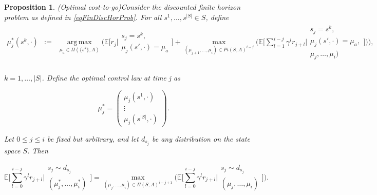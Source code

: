 \documentclass[11pt]{article} %
\newtheorem{prop}{Proposition}
\DeclareMathOperator*{\argmax}{arg\,max}
\begin{document}
\begin{prop}(Optimal cost-to-go)\label{lemBuildingFiniteSolution}
	Consider the discounted finite horizon problem as defined in \ref{eqFinDiscHorProb}. For all $s^1,\dots,s^{|S|} \in S$, define
\begin{equation}
	\begin{array}{clll}
		\mu_j^*(s^k,\cdot)	& := 	& \argmax\limits_{\mu_a \in \Pi(\{s^k\},A)} \Big( \mathbb{E}\Big[r_j \Big| \begin{array}{c}
																							s_j = s^k, \\
																							\mu_j(s',\cdot) = \mu_a
																						\end{array} 
																							\Big] + \max\limits_{(\mu_{j+1},\dots,\mu_i) \in Pi(S,A)^{i-j}}\Big( \mathbb{E} \Big[ \sum\limits_{l=1}^{i-j}\gamma^l r_{j+l} \Big| \begin{array}{c}
															s_j = s^k, \\
															\mu_j(s',\cdot) = \mu_a, \\
															\mu_j,\dots,\mu_i)
														\end{array} \Big] \Big)\Big),\\
	\end{array}
\end{equation}

$k=1,\dots,|S|$. Define the optimal control law at time j as

\begin{equation}
	\mu_j^* = 	\left(\begin{array}{c}
						\mu_j(s^1,\cdot) \\
						\vdots \\
						\mu_j(s^{|S|},\cdot)
				\end{array}\right).
\end{equation}

Let $0\le j \le i$ be fixed but arbitrary, and let $d_{s_j}$ be any distribution on the state space $S$. Then 

\begin{equation}
	\mathbb{E}\Big[ \sum\limits_{l=0}^{i-j} \gamma^l r_{j+l} \Big| 	\begin{array}{c}
														s_j \sim d_{s_j} \\
														(\mu_j^*,\dots,\mu^*_i)
													\end{array} \Big] = \max\limits_{(\mu_j,\dots,\mu_i) \in \Pi(S,A)^{i-j+1}} \Big( \mathbb{E} \Big[ \sum\limits_{l=0}^{i-j} \gamma^l r_{j+l} \Big| 	\begin{array}{c}
													s_j \sim d_{s_j} \\
													(\mu_j,\dots,\mu_i)
												\end{array} \Big] \Big).
\end{equation}


\end{prop}
\end{document}

